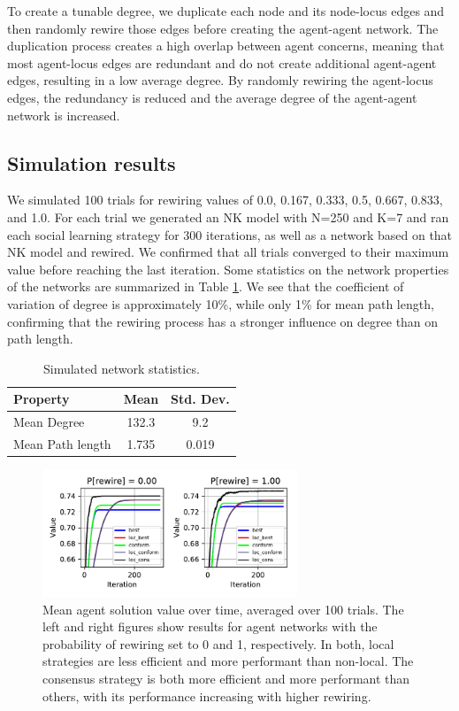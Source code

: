 To create a tunable degree, we duplicate each node and its node-locus edges and then
randomly rewire those edges before creating the agent-agent network.
The duplication process creates a high overlap between agent concerns,
meaning that most agent-locus edges are redundant and do not create additional agent-agent edges,
resulting in a low average degree.
By randomly rewiring the agent-locus edges, the redundancy is reduced and the average degree of
the agent-agent network is increased.

\subsection{Simulation results}

We simulated 100 trials for rewiring values of 0.0, 0.167, 0.333, 0.5, 0.667, 0.833, and 1.0.
For each trial we generated an NK model with N=250 and K=7 and ran each social learning strategy
for 300 iterations,
as well as a network based on that NK model and rewired.
We confirmed that all trials converged to their maximum value before reaching the last iteration.
Some statistics on the network properties of the networks are summarized in Table \ref{tab:stats}.
We see that the coefficient of variation of degree is approximately 10\%,
while only 1\% for mean path length, confirming that the rewiring process has a stronger influence
on degree than on path length.

\begin{table}
\small
\centering
\caption{
Simulated network statistics.
\label{tab:stats}
}
\bigskip
\begin{tabular}{lcc}
\hline
Property          & Mean  & Std. Dev. \\
\hline
Mean Degree       & 132.3 & 9.2 \\
Mean Path length  & 1.735 & 0.019 \\
\hline
\end{tabular}
\end{table}

\begin{figure}
\includegraphics[width=3in,height=1.5in]{fig-val-iter.pdf}
\caption{
Mean agent solution value over time, averaged over 100 trials.
The left and right figures show results for agent networks with the probability of
rewiring set to 0 and 1, respectively.
In both, local strategies are less efficient and more performant than non-local.
The consensus strategy is both more efficient and more performant than others,
with its performance increasing with higher rewiring.
\label{fig:val-iter}
}
\end{figure}

